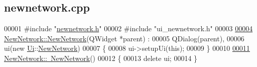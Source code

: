 \hypertarget{newnetwork_8cpp_source}{}\subsection{newnetwork.\+cpp}
\label{newnetwork_8cpp_source}

\begin{DoxyCode}
00001 \textcolor{preprocessor}{#include "\hyperlink{newnetwork_8h}{newnetwork.h}"}
00002 \textcolor{preprocessor}{#include "ui\_newnetwork.h"}
00003 
\hypertarget{newnetwork_8cpp_source_l00004}{}\hyperlink{class_new_network_a3a8c6341866f1f246848804ed4d0f85e}{00004} \hyperlink{class_new_network_a3a8c6341866f1f246848804ed4d0f85e}{NewNetwork::NewNetwork}(QWidget *parent) :
00005   QDialog(parent),
00006   ui(new \hyperlink{namespace_ui}{Ui}::\hyperlink{class_new_network}{NewNetwork})
00007 \{
00008   ui->setupUi(\textcolor{keyword}{this});
00009 \}
00010 
\hypertarget{newnetwork_8cpp_source_l00011}{}\hyperlink{class_new_network_aaf5cae0a16a1a46c2b0daecab6ca150f}{00011} \hyperlink{class_new_network_aaf5cae0a16a1a46c2b0daecab6ca150f}{NewNetwork::~NewNetwork}()
00012 \{
00013   \textcolor{keyword}{delete} ui;
00014 \}
\end{DoxyCode}
